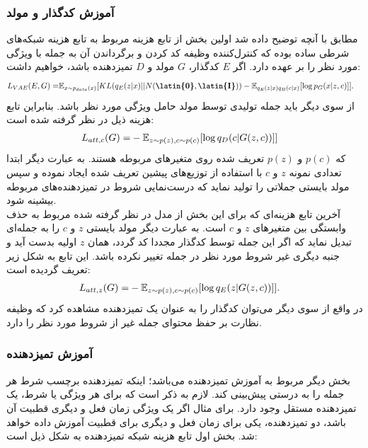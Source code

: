 \subsubsection*{آموزش کدگذار و مولد}
مطابق با آنچه توضیح داده شد اولین بخش از تابع هزینه مربوط به تابع هزینه شبکه‌های \vae{} شرطی ساده بوده که کنترل‌کننده وظیفه کد کردن و برگرداندن آن به جمله با ویژگی مورد نظر را بر عهده دارد. اگر $E$ کدگذار، $G$ مولد و $D$ تمیزدهنده باشد، خواهیم داشت:
\begin{equation}
	\begin{split}
		L_{VAE} (E, G) =& \expected_{x \sim p_{data}(x)} [KL (q_E(z|x) || N(\textbf{\latin{0}},\textbf{\latin{I}})) - \expected_{q_E(z|x)q_D(c|x)} [\log p_G(x|z,c)]].
	\end{split}
\end{equation}
از سوی دیگر باید جمله تولیدی توسط مولد حامل ویژگی مورد نظر باشد. بنابراین تابع هزینه ذیل در نظر گرفته شده است:
\begin{equation}
	\begin{split}
		L_{att, c} (G) =& -\mathbb E_{z \sim p(z), c \sim p(c)} [\log q_D(c|G(z, c))]]
	\end{split}
\end{equation}
که $p(c)$ و $p(z)$
تعریف شده روی متغیرهای مربوطه هستند. به عبارت دیگر ابتدا تعدادی نمونه $z$ و $c$ با استفاده از توزیع‌های پیشین تعریف شده ایجاد نموده و سپس مولد بایستی جملاتی را تولید نماید که درست‌نمایی شروط در تمیزدهنده‌های مربوطه بیشینه شود.\\
آخرین تابع هزینه‌ای که برای این بخش از مدل در نظر گرفته شده مربوط به حذف وابستگی بین متغیرهای $z$ و $c$ است. به عبارت دیگر مولد بایستی $z$ و $c$ را به جمله‌ای تبدیل نماید که اگر این جمله توسط کدگذار مجددا کد گردد، همان $z$ اولیه بدست آید و جنبه دیگری غیر شروط مورد نظر در جمله تغییر نکرده باشد. این تابع به شکل زیر تعریف گردیده است:
\begin{equation}
	\begin{split}
		L_{att, z} (G) =& -\mathbb E_{z \sim p(z), c \sim p(c)} [\log q_E(z|G(z, c))]].
	\end{split}
\end{equation}
در واقع از سوی دیگر می‌توان کدگذار را به عنوان یک تمیزدهنده‌ مشاهده کرد که وظیفه نظارت بر حفظ محتوای جمله غیر از شروط مورد نظر را دارد.
\subsubsection*{آموزش تمیزدهنده}
بخش دیگر مربوط به آموزش تمیزدهنده می‌باشد؛ اینکه تمیزدهنده برچسب شرط هر جمله را به درستی پیش‌بینی کند. لازم به ذکر است که برای هر ویژگی یا شرط، یک تمیزدهنده مستقل وجود دارد. برای مثال اگر یک ویژگی زمان فعل و دیگری قطبیت آن باشد، دو تمیزدهنده، یکی برای زمان فعل و دیگری برای قطبیت آموزش داده خواهد شد. بخش اول تابع هزینه شبکه تمیزدهنده به شکل ذیل است:

